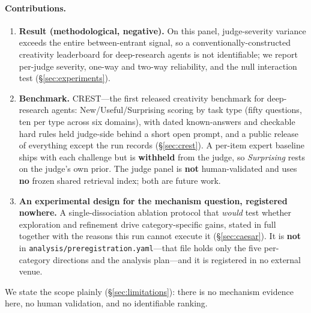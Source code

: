 \paragraph{Contributions.}
\begin{enumerate}
  \item \textbf{Result (methodological, negative).} On this panel, judge-severity variance exceeds
    the entire between-entrant signal, so a conventionally-constructed creativity leaderboard for
    deep-research agents is not identifiable; we report per-judge severity, one-way and two-way
    reliability, and the null interaction test (\S\ref{sec:experiments}).
  \item \textbf{Benchmark.} CREST---the first released creativity benchmark for deep-research
    agents: New/Useful/Surprising scoring by task type (fifty questions, ten per type across six
    domains), with dated known-answers and checkable hard rules held judge-side behind a short open
    prompt, and a public release of everything except the run records (\S\ref{sec:crest}). A
    per-item expert baseline ships with each challenge but is \textbf{withheld} from the judge, so
    \emph{Surprising} rests on the judge's own prior. The judge panel is
    \textbf{not} human-validated and uses \textbf{no} frozen shared retrieval index; both are future
    work.
  \item \textbf{An experimental design for the mechanism question, registered nowhere.} A
    single-dissociation ablation protocol that \emph{would} test whether exploration and refinement
    drive category-specific gains, stated in full together with the reasons this run cannot execute
    it (\S\ref{sec:caesar}). It is \textbf{not} in
    \texttt{analysis/preregistration.yaml}---that file holds only the five per-category directions
    and the analysis plan---and it is registered in no external venue.
\end{enumerate}

We state the scope plainly (\S\ref{sec:limitations}): there is no mechanism evidence here, no human
validation, and no identifiable ranking.
